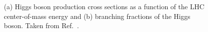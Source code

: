 \captionsetup[subfloat]{captionskip=10pt} %
\begin{figure}
  \begin{center}
  \end{center}
  \caption{(a) Higgs boson production cross sections as a function of the LHC center-of-mass energy and (b) branching fractions of the Higgs boson. Taken from Ref.~\cite{deFlorian:2016spz}.}
\end{figure}
\captionsetup[subfloat]{captionskip=5pt} %


